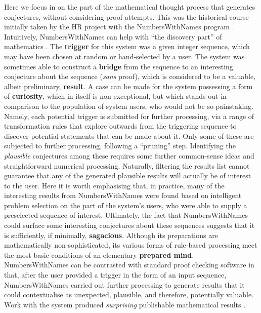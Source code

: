 Here we focus in on the part of the mathematical thought process that generates
conjectures, without considering proof attempts.  This was the
historical course initially taken by the {\sf HR} project with the
{\sf NumbersWithNames} program \cite{colton2002numberswithnames}.
Intuitively, {\sf NumbersWithNames} can help with ``the discovery
part'' of mathematics \cite[p.~7]{colton2002numberswithnames}.
The \textbf{trigger} for this system was a given integer sequence,
which may have been chosen at random or hand-selected by a user.  The system was sometimes able to construct a \textbf{bridge} from the sequence to an
interesting conjecture about the sequence (\emph{sans} proof), which is
considered to be a valuable, albeit preliminary, \textbf{result}.  A
case can be made for the system possessing a form of
\textbf{curiosity}, which in itself is non-exceptional,
but which stands out in comparison to the population of system users,
who would not be so painstaking.
Namely, each potential trigger is submitted for further processing,
via a range of transformation rules that explore outwards
from the triggering sequence to discover potential statements that can
be made about it.  Only some of these are subjected to further
processing, following a ``pruning'' step.  Identifying the
\emph{plausible} conjectures among these requires some further
common-sense ideas and straightforward numerical processing.
Naturally, filtering the results list cannot guarantee that any of the
generated plausible results will actually be of interest to the user.  Here it is
worth emphasising that, in practice, many of the interesting results
from {\sf NumbersWithNames} were found based on intelligent problem
selection on the part of the system's users, who were able to supply
a preselected sequence of interest.  Ultimately, the fact that {\sf
  NumbersWithNames} could surface some interesting conjectures about these
sequences suggests that it is sufficiently, if minimally, \textbf{sagacious}.  Although its preparations are mathematically non-sophisticated, its
various forms of rule-based processing meet the most basic conditions of an elementary
\textbf{prepared mind}. 
{\sf NumbersWithNames} can be contrasted with standard proof checking
software in that, after the user provided a trigger in the form of an
input sequence, {\sf NumbersWithNames} carried out further processing
to generate results that it could contextualise as unexpected,
plausible, and therefore, potentially valuable.  Work with the system
produced \emph{surprising} publishable mathematical results
\cite{colton1999refactorable}.

